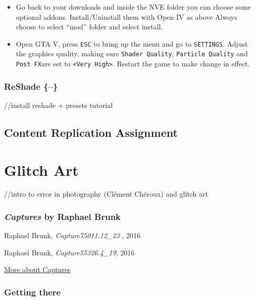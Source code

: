 \documentclass[
  openany]{book}
\begin{document}
\begin{itemize}
\item
  Go back to your downloads and inside the NVE folder you can choose some optional addons. Install/Uninstall them with Open IV as above Always choose to select ``mod'' folder and select install.
\item
  Open GTA V, press \texttt{ESC} to bring up the menu and go to \texttt{SETTINGS}. Adjust the graphics quality, making sure \texttt{Shader\ Quality}, \texttt{Particle\ Quality} and \texttt{Post\ FX}are set to \texttt{\textless{}Very\ High\textgreater{}}. Restart the game to make change in effect.
\end{itemize}

\hypertarget{reshade}{%
\subsection{ReShade \{--\}}\label{reshade}}

//install reshade + presets tutorial

\hypertarget{content-replication-assignment-5}{%
\section*{Content Replication Assignment}\label{content-replication-assignment-5}}

\hypertarget{glitch-art}{%
\chapter{Glitch Art}\label{glitch-art}}

//intro to error in photography (Clément Chéroux) and glitch art

\hypertarget{captures-by-raphael-brunk}{%
\subsection*{\texorpdfstring{\emph{Captures} by Raphael Brunk}{Captures by Raphael Brunk}}\label{captures-by-raphael-brunk}}

Raphael Brunk, \emph{Capture75011.12\_23 }, 2016

Raphael Brunk, \emph{Capture55326.4\_19}, 2016

\href{http://www.darktaxa-project.net/artists/raphael-brunk/}{More about Captures}

\hypertarget{getting-there-9}{%
\subsection*{Getting there}\label{getting-there-9}}
\end{document}
